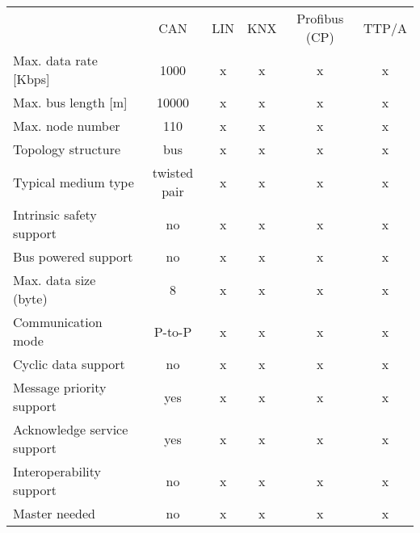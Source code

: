 
\begin{center}
\begin{tabular}{lccccc}
 & CAN & LIN & KNX & Profibus (CP) & TTP/A\\
Max. data rate [Kbps] & 1000 & x & x & x & x\\
Max. bus length [m] & 10000 & x & x & x & x\\
Max. node number & 110 & x & x & x & x\\
Topology structure & bus & x & x & x & x\\
Typical medium type & twisted pair & x & x & x & x\\
Intrinsic safety support & no & x & x & x & x\\
Bus powered support & no & x & x & x & x\\
Max. data size (byte) & 8 & x & x & x & x\\
Communication mode & P-to-P & x & x & x & x\\
Cyclic data support & no & x & x & x & x\\
Message priority support & yes & x & x & x & x\\
Acknowledge service support & yes & x & x & x & x\\
Interoperability support & no & x & x & x & x \\
Master needed & no & x & x & x & x \\
\end{tabular}
\end{center}
